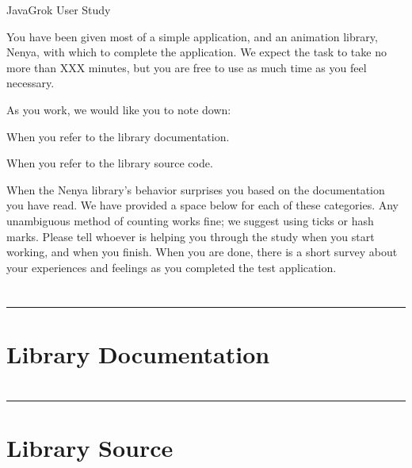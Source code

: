 \documentclass{article}
\let\Enumerate =\enumerate
\def\Nospacing{\itemsep=0pt\topsep=0pt\partopsep=0pt\parskip=0pt\parsep=0pt}
\renewenvironment{enumerate}{\Enumerate\Nospacing}{\endlist}
\begin{document}
\begin{center}
\LARGE JavaGrok User Study
\end{center}

You have been given most of a simple application, and an animation library, Nenya,
with which to complete the application.  We expect the task to take no more than
XXX minutes, but you are free to use as much time as you feel necessary.

As you work, we would like you to note down:
\begin{enumerate}
\item When you refer to the library documentation.
\item When you refer to the library source code.
\item When the Nenya library's behavior surprises you based on the documentation
you have read.
\end{enumerate}
We have provided a space below for each of these categories.  Any unambiguous
method of counting works fine; we suggest using ticks or hash marks.  Please
tell whoever is helping you through the study when you start working, and when
you finish.  When you are done, there is a short survey about your experiences
and feelings as you completed the test application.
\section*{}

\hrule
\vspace{0.2in}
\section*{Library Documentation}

\section*{}
\section*{}
\hrule
\vspace{0.2in}

\section*{Library Source}
\section*{}
\end{document}
